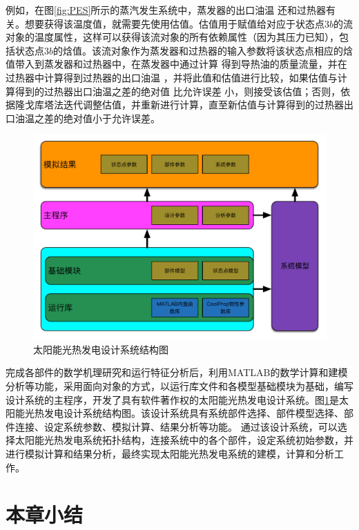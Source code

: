 例如，在图\ref{fig:PES}所示的蒸汽发生系统中，蒸发器的出口油温%
还和过热器有关。想要获得该温度值，就需要先使用估值。估值用于赋值给对应于状态点$3b$的流对象的温度属性，这样可以获得该流对象的所有依赖属性（因为其压力已知），包括状态点$3b$的焓值。该流对象作为蒸发器和过热器的输入参数将该状态点相应的焓值带入到蒸发器和过热器中，在蒸发器中通过计算
得到导热油的质量流量，并在过热器中计算得到过热器的出口油温
，并将此值和估值进行比较，如果估值与计算得到的过热器出口油温之差的绝对值
比允许误差
小，则接受该估值；否则，依据隆戈库塔法迭代调整估值，并重新进行计算，直至新估值与计算得到的过热器出口油温之差的绝对值小于允许误差。

\begin{figure}[htbp]
\begin{center}
	\includegraphics[width = 0.8\columnwidth]{fig/SystemFlow}
	\caption{太阳能光热发电设计系统结构图}
	\label{fig:SystemFlow}
\end{center}
\end{figure}

完成各部件的数学机理研究和运行特征分析后，利用MATLAB的数学计算和建模分析等功能，采用面向对象的方式，以运行库文件和各模型基础模块为基础，编写设计系统的主程序，开发了具有软件著作权的太阳能光热发电设计系统。图\ref{fig:SystemFlow}是太阳能光热发电设计系统结构图。该设计系统具有系统部件选择、部件模型选择、部件连接、设定系统参数、模拟计算、结果分析等功能。
通过该设计系统，可以选择太阳能光热发电系统拓扑结构，连接系统中的各个部件，设定系统初始参数，并进行模拟计算和结果分析，最终实现太阳能光热发电系统的建模，计算和分析工作。

\section{本章小结}

